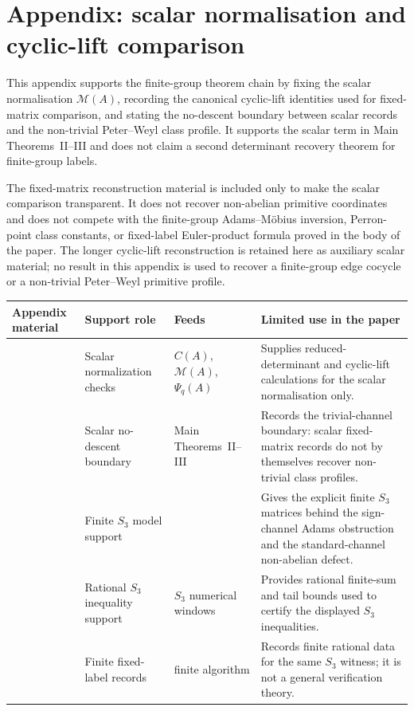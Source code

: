 \section{Appendix: scalar normalisation and cyclic-lift comparison}
\label{app:cyclic-lift-comparison}

This appendix supports the finite-group theorem chain by fixing the scalar
normalisation \(\mathcal M(A)\), recording the canonical cyclic-lift identities
used for fixed-matrix comparison, and stating the no-descent boundary between
scalar records and the non-trivial Peter--Weyl class profile.  It supports the
scalar term in Main Theorems~II--III and does not claim a second determinant
recovery theorem for finite-group labels.

The fixed-matrix reconstruction material is included only to make the scalar
comparison transparent. It does not recover non-abelian primitive coordinates
and does not compete with the finite-group Adams--M\"obius inversion,
Perron-point class constants, or fixed-label Euler-product formula proved in
the body of the paper. The longer cyclic-lift reconstruction is retained here
as auxiliary scalar material; no result in this appendix is used to recover a
finite-group edge cocycle or a non-trivial Peter--Weyl primitive profile.
\begin{center}
\begin{tabular}{@{}L{0.24\textwidth}L{0.21\textwidth}L{0.19\textwidth}L{0.26\textwidth}@{}}
\toprule
Appendix material & Support role & Feeds & Limited use in the paper \\
\midrule
{}
& Scalar normalization checks
& \(C(A)\), \(\mathcal M(A)\), \(\Psi_q(A)\)
& Supplies reduced-determinant and cyclic-lift calculations for the scalar
normalisation only. \\
& Scalar no-descent boundary
& Main Theorems~II--III
& Records the trivial-channel boundary: scalar fixed-matrix records do not by
themselves recover non-trivial class profiles. \\
& Finite \(S_3\) model support
& 
& Gives the explicit finite \(S_3\) matrices behind the sign-channel
Adams obstruction and the standard-channel non-abelian defect. \\
& Rational \(S_3\) inequality support
& \(S_3\) numerical windows
& Provides rational finite-sum and tail bounds used to certify the
displayed \(S_3\) inequalities. \\
& Finite fixed-label records
& finite algorithm
& Records finite rational data for the same \(S_3\) witness; it is not a
general verification theory. \\
\bottomrule
\end{tabular}
\end{center}

